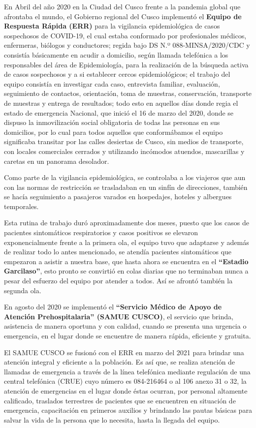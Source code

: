 \documentclass[12pt,a4paper,openany]{book}
\begin{document}
En Abril del año 2020 en la Ciudad del Cusco frente a la pandemia global que afrontaba el mundo, el Gobierno regional del Cusco implementó el \textbf{Equipo de Respuesta Rápida (ERR)} para la vigilancia epidemiológica de casos sospechosos de COVID-19, el cual estaba conformado por profesionales médicos, enfermeras, biólogos y conductores; regida bajo DS N.º 088-MINSA/2020/CDC y consistía básicamente en acudir a domicilio, según llamada telefónica a los responsables del área de Epidemiología, para la realización de la búsqueda activa de casos sospechosos y a si establecer cercos epidemiológicos; el trabajo del equipo consistía en  investigar cada caso, entrevista familiar, evaluación, seguimiento de contactos, orientación, toma de muestras, conservación, transporte de muestras y entrega de resultados; todo esto en aquellos días donde regia el estado de emergencia Nacional, que inició el 16 de marzo del 2020, donde se dispuso la inmovilización social obligatoria de todas las personas en sus domicilios, por lo cual para todos aquellos que conformábamos el equipo significaba transitar por las calles desiertas de Cusco, sin medios de transporte, con locales comerciales cerrados y utilizando incómodos atuendos, mascarillas y caretas en un panorama  desolador. 

Como parte de la vigilancia epidemiológica, se controlaba a los viajeros que aun con las normas de restricción se trasladaban en un sinfín de direcciones, también se hacía seguimiento a pasajeros varados en hospedajes, hoteles y albergues temporales.

Esta rutina de trabajo duró aproximadamente dos meses, puesto que los casos de pacientes sintomáticos respiratorios y casos positivos se elevaron exponencialmente frente a la primera ola, el equipo tuvo que adaptarse y además de realizar todo lo antes mencionado, se atendía pacientes sintomáticos que empezaron a asistir a nuestra base, que hasta ahora se encuentra en el  \textbf{“Estadio Garcilaso”}, esto pronto se convirtió en colas diarias que no terminaban nunca a pesar del esfuerzo del equipo por atender a todos. Así se afrontó también la segunda ola.

En agosto del 2020 se implementó el \textbf{“Servicio Médico de Apoyo de Atención Prehospitalaria” (SAMUE CUSCO)}, el servicio que brinda, asistencia de manera oportuna y con calidad, cuando se presenta una urgencia o emergencia, en el lugar donde se encuentre de manera rápida, eficiente y gratuita.

El SAMUE CUSCO se fusionó con el ERR en marzo del 2021 para brindar una atención integral y eficiente a la población. Es así que, se realiza atención de llamadas de emergencia a través de la línea telefónica mediante regulación de una central telefónica (CRUE) cuyo número es 084-216464 o al 106 anexo 31 o 32, la atención de emergencias en el lugar donde éstas ocurran, por personal altamente calificado, traslados terrestres de pacientes que se encuentren en situación de emergencia, capacitación en primeros auxilios y brindando las pautas básicas para salvar la vida de la persona que lo necesita, hasta la llegada del equipo.
\end{document}
